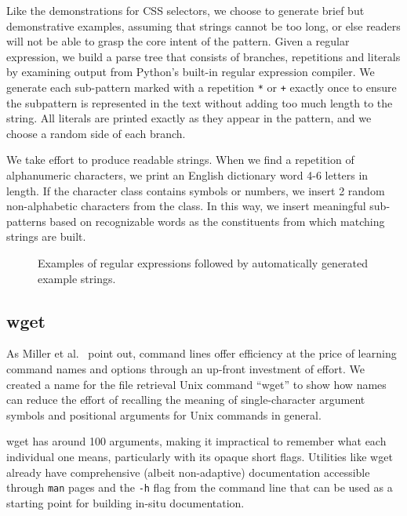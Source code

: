 Like the demonstrations for CSS selectors, we choose to generate brief but demonstrative examples, assuming that strings cannot be too long, or else readers will not be able to grasp the core intent of the pattern.
Given a regular expression, we build a parse tree that consists of branches, repetitions and literals by examining output from Python's built-in regular expression compiler.
We generate each sub-pattern marked with a repetition \texttt{*} or \texttt{+} exactly once to ensure the subpattern is represented in the text without adding too much length to the string.
All literals are printed exactly as they appear in the pattern, and we choose a random side of each branch. 

We take effort to produce readable strings.
When we find a repetition of alphanumeric characters, we print an English dictionary word 4-6 letters in length.
If the character class contains symbols or numbers, we insert 2 random non-alphabetic characters from the class.
In this way, we insert meaningful sub-patterns based on recognizable words as the constituents from which matching strings are built.
\fi

\begin{figure}
\centering
\setlength{\fboxsep}{10pt}
\noindent{}
\caption{Examples of regular expressions followed by automatically generated example strings.}
\label{fig:regex_strings}
\end{figure}

\subsection{wget}

\begin{changes}
As Miller et al.~\cite{miller_inky_2008} point out, command lines offer efficiency at the price of learning command names and options through an up-front investment of effort.
We created a \Gls{name} for the file retrieval Unix command ``wget'' to show how \Glspl{name} can reduce the effort of recalling the meaning of single-character argument symbols and positional arguments for Unix commands in general.
\end{changes}
wget has around 100 arguments, making it impractical to remember what each individual one means, particularly with its opaque short flags.
Utilities like wget already have comprehensive (albeit non-adaptive) documentation accessible through \texttt{man} pages and the \texttt{-h} flag from the command line that can be used as a starting point for building in-situ documentation.

